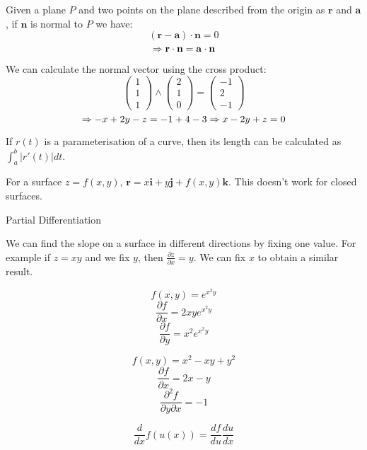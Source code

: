 \documentclass[a4paper,10pt]{article}
\begin{document}
\begin{ex}
	Given a plane $P$ and two points on the plane described from the origin
	as $\mathbf{r}$ and $\mathbf{a}$, if $\mathbf{n}$ is normal to $P$ we
	have:
	\[ (\mathbf{r} - \mathbf{a}) \cdot \mathbf{n} = 0 \]
	\[ \Rightarrow \mathbf{r} \cdot \mathbf{n} = \mathbf{a} \cdot \mathbf{n} \]

	We can calculate the normal vector using the cross product:
	\[ 
		\begin{pmatrix}
			1\\1\\1
		\end{pmatrix}
		\wedge
		\begin{pmatrix}
			2\\1\\0
		\end{pmatrix}
		=
		\begin{pmatrix}
			-1\\2\\-1
		\end{pmatrix}
	\]
	\[ \Rightarrow -x + 2y - z = -1 + 4 - 3 \Rightarrow x - 2y + z = 0 \]
\end{ex}
	
If $r(t)$ is a parameterisation of a curve, then its length can be calculated
as $ \int_a^b | r'(t) | dt $.

For a surface $z = f(x,y)$, $\mathbf{r} = x\mathbf{i} + y\mathbf{j} +
f(x,y)\mathbf{k}$. This doesn't work for closed surfaces.


Partial Differentiation

We can find the slope on a surface in different directions by fixing one value.
For example if $z = xy$ and we fix $y$, then $\frac{\partial z}{\partial x} =
y$. We can fix $x$ to obtain a similar result.

\begin{ex}
	\[ f(x,y) = e^{x^2y} \]
	\[ \frac{\partial f}{\partial x} = 2xy e^{x^2y} \]
	\[ \frac{\partial f}{\partial y} = x^2 e^{x^2y} \]
\end{ex}

\begin{ex}
	\[ f(x,y) = x^2 - xy + y^2 \]
	\[ \frac{\partial f}{\partial x} = 2x - y \]
	\[ \frac{\partial ^2 f}{\partial y \partial x} = -1 \]
\end{ex}

\begin{thm}
	\[ \frac{d}{dx} f(u(x)) = \frac{df}{du} \frac{du}{dx} \]
\end{thm}
\end{document}
